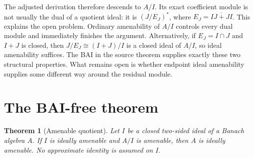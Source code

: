 \documentclass[11pt]{article}
\newtheorem{theorem}{Theorem}
\newcommand{\cl}{\overline}
\begin{document}
The adjusted derivation therefore descends to $A/I$.  Its exact coefficient
module is not usually the dual of a quotient ideal: it is
$(J/E_J)^*$, where $E_J=\cl{IJ+JI}$.  This explains the open problem.
Ordinary amenability of $A/I$ controls every dual module and immediately
finishes the argument.  Alternatively, if $E_J=I\cap J$ and $I+J$ is
closed, then $J/E_J\cong (I+J)/I$ is a closed ideal of $A/I$, so ideal
amenability suffices.  The BAI in the source theorem supplies exactly these
two structural properties.  What remains open is whether endpoint ideal
amenability supplies some different way around the residual module.

\section{The BAI-free theorem}
\begin{theorem}[Amenable quotient]\label{thm:amenable-quotient}
Let $I$ be a closed two-sided ideal of a Banach algebra $A$.  If $I$ is
ideally amenable and $A/I$ is amenable, then $A$ is ideally amenable.  No
approximate identity is assumed on $I$.
\end{theorem}
\end{document}
